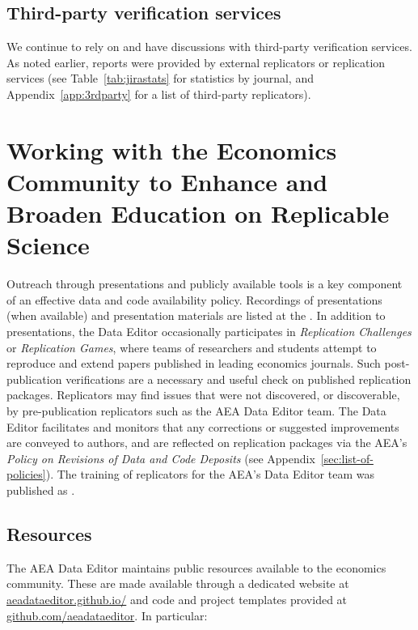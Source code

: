 \subsection{Third-party verification services}
\label{sec:3rdparty}


We continue to rely on and have discussions with third-party verification services. As noted earlier, \jiraexternal{} reports were provided by external replicators or replication services
(see Table~\ref{tab:jirastats} for statistics by journal, and Appendix~\ref{app:3rdparty} for a list of third-party replicators). 

\section{Working with the Economics Community to Enhance and Broaden Education on Replicable Science}

Outreach through presentations and publicly available tools is a key component of an effective data and code availability policy. 
%
Recordings of  presentations (when available) and presentation materials are listed at the . In addition to presentations, the Data Editor occasionally participates in \textit{Replication Challenges} or \textit{Replication Games}, where teams of researchers and students attempt to reproduce and extend papers published in leading economics journals. Such post-publication verifications are a necessary and useful check on published replication packages. Replicators may find issues that were not discovered, or discoverable, by pre-publication replicators such as the AEA Data Editor team. The Data Editor facilitates and monitors that any corrections or suggested improvements are conveyed to authors, and are reflected on replication packages via the AEA's \textit{Policy on Revisions of Data and Code Deposits} (see Appendix~\ref{sec:list-of-policies}). 
%
The training of replicators for the AEA's Data Editor team was published as \citet{vilhuber_teaching_2022}.

\subsection{Resources}

The AEA Data Editor maintains public resources available to the economics community. These are made available through a dedicated website at \href{https://aeadataeditor.github.io/}{aeadataeditor.github.io/} and code and project templates provided at \href{https://github.com/aeadataeditor}{github.com/aeadataeditor}. In particular:

